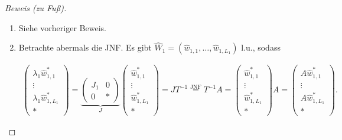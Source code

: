 \begin{proof}[Beweis (zu Fuß)]

    \begin{enumerate}[label = (\roman*)]

        \item Siehe vorheriger Beweis.

        \item Betrachte abermals die JNF.
        Es gibt $\hat W_1 = (\hat w_{1, 1}, \dots, \hat w_{1, L_1})$ l.u., sodass
        
        \begin{align*}
            \begin{pmatrix}
                \lambda_1 \hat w_{1,   1}^\ast \\
                \vdots                         \\
                \lambda_1 \hat w_{1, L_1}^\ast \\
                \ast
            \end{pmatrix}
            =
            \underbrace
            {
                \begin{pmatrix}
                    J_1 & 0 \\
                    0   & \ast
                \end{pmatrix}
            }_J
            \begin{pmatrix}
                \hat w_{1,   1}^\ast \\
                \vdots               \\
                \hat w_{1, L_1}^\ast \\
                \ast
            \end{pmatrix}
            =
            J T^{-1}
            \stackrel
            {
                \text{JNF}
            }{=}
            T^{-1} A
            =
            \begin{pmatrix}
                \hat w_{1,   1}^\ast \\
                \vdots               \\
                \hat w_{1, L_1}^\ast \\
                \ast
            \end{pmatrix}
            A
            =
            \begin{pmatrix}
                A \hat w_{1,   1}^\ast \\
                \vdots                 \\
                A \hat w_{1, L_1}^\ast \\
                \ast
            \end{pmatrix}.
        \end{align*}


\end{enumerate}
\end{proof}
